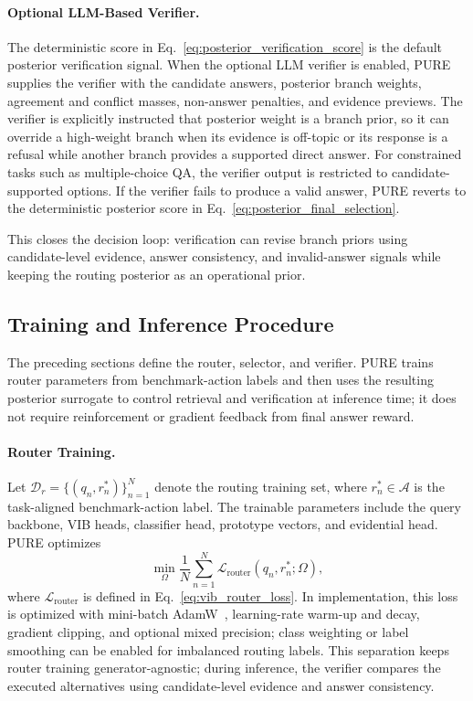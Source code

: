 \documentclass[a4paper,fleqn]{cas-dc}
\begin{document}
\paragraph{Optional LLM-Based Verifier.}
The deterministic score in Eq.~\eqref{eq:posterior_verification_score} is the default posterior verification signal. When the optional LLM verifier is enabled, PURE supplies the verifier with the candidate answers, posterior branch weights, agreement and conflict masses, non-answer penalties, and evidence previews. The verifier is explicitly instructed that posterior weight is a branch prior, so it can override a high-weight branch when its evidence is off-topic or its response is a refusal while another branch provides a supported direct answer. For constrained tasks such as multiple-choice QA, the verifier output is restricted to candidate-supported options. If the verifier fails to produce a valid answer, PURE reverts to the deterministic posterior score in Eq.~\eqref{eq:posterior_final_selection}.

This closes the decision loop: verification can revise branch priors using candidate-level evidence, answer consistency, and invalid-answer signals while keeping the routing posterior as an operational prior.

\subsection{Training and Inference Procedure}
\label{subsec:training_inference}

The preceding sections define the router, selector, and verifier. PURE trains router parameters from benchmark-action labels and then uses the resulting posterior surrogate to control retrieval and verification at inference time; it does not require reinforcement or gradient feedback from final answer reward.

\paragraph{Router Training.}
Let $\mathcal{D}_{r}=\{(q_n,r_n^*)\}_{n=1}^{N}$ denote the routing training set, where $r_n^*\in\mathcal{A}$ is the task-aligned benchmark-action label. The trainable parameters include the query backbone, VIB heads, classifier head, prototype vectors, and evidential head. PURE optimizes
\begin{equation}
\label{eq:training_empirical_risk}
\min_{\Omega}
\frac{1}{N}
\sum_{n=1}^{N}
\mathcal{L}_{\mathrm{router}}(q_n,r_n^*;\Omega),
\end{equation}
where $\mathcal{L}_{\mathrm{router}}$ is defined in Eq.~\eqref{eq:vib_router_loss}. In implementation, this loss is optimized with mini-batch AdamW~\citep{Loshchilov2019AdamW}, learning-rate warm-up and decay, gradient clipping, and optional mixed precision; class weighting or label smoothing can be enabled for imbalanced routing labels. This separation keeps router training generator-agnostic; during inference, the verifier compares the executed alternatives using candidate-level evidence and answer consistency.
\end{document}
